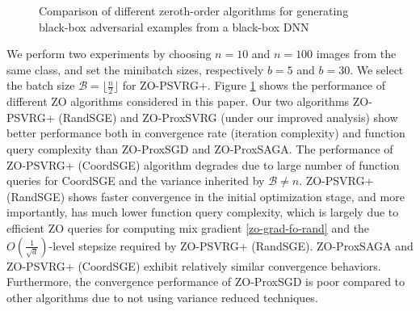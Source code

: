 \begin{figure}[htbp]
%
%
\setlength{\abovecaptionskip}{2pt}
\caption{Comparison of different zeroth-order algorithms for generating black-box adversarial examples from a black-box DNN}
\label{attack-fig}
\end{figure}
We perform two experiments by choosing $n = 10$ and $n=100$ images from the same class, and set the minibatch sizes, respectively $b=5$ and $b = 30$. We select the batch size $\mathcal{B} = \lfloor{\frac{n}{2}}\rfloor$ for ZO-PSVRG+.
Figure \ref{attack-fig} shows
the performance of different ZO algorithms considered in this paper. Our two algorithms ZO-PSVRG+ (RandSGE) and ZO-ProxSVRG (under our improved analysis) show better performance
both in convergence rate (iteration complexity) and function query complexity than ZO-ProxSGD
and ZO-ProxSAGA. The performance of ZO-PSVRG+ (CoordSGE) algorithm degrades due to large number of function queries for CoordSGE and the variance inherited by $\mathcal{B} \neq n$. 
ZO-PSVRG+ (RandSGE) shows faster convergence in the initial optimization stage, and more importantly, has much lower function query complexity, which is largely
due to efficient ZO queries for computing mix gradient \eqref{zo-grad-fo-rand} and  the $O(\frac{1}{\sqrt{d}})$-level stepsize required by ZO-PSVRG+ (RandSGE). ZO-ProxSAGA and ZO-PSVRG+ (CoordSGE) exhibit relatively similar convergence behaviors. Furthermore, the convergence performance of ZO-ProxSGD is poor compared to other algorithms due to not using variance reduced techniques. 

